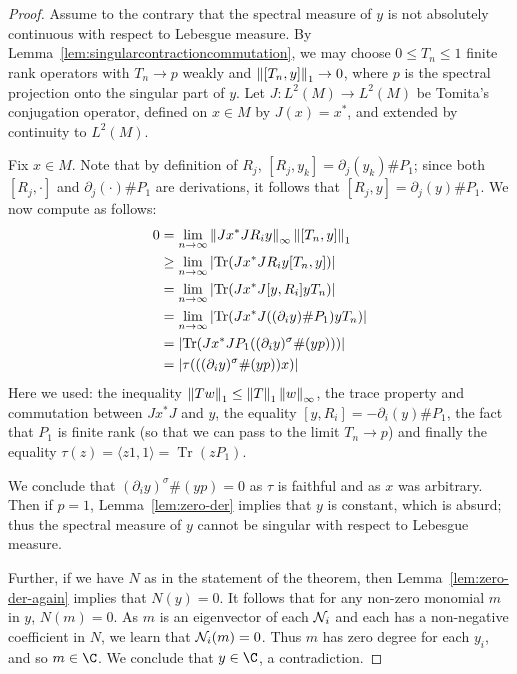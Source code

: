 \begin{proof}
	Assume to the contrary that the spectral measure of $y$ is not absolutely continuous with respect to Lebesgue measure.
	By Lemma~\ref{lem:singularcontractioncommutation}, we may choose $0\leq T_n \leq 1$ finite rank operators with $T_n\to p$ weakly and $\left\|[T_n,y]\right\|_1 \to 0$, where $p$ is the spectral projection onto the singular part of $y$.
	Let $J : L^2(M)\to L^2(M)$ be Tomita's conjugation operator, defined on $x \in M$ by $J(x) = x^*$, and extended by continuity to $L^2(M)$.

	Fix $x \in M$.
	Note that by definition of $R_j$, $[R_j,y_k]=\partial_j (y_k) \# P_1$; since both $[R_j,\cdot]$ and $\partial_j(\cdot)\#P_1$ are derivations, it follows that $[R_j,y]=\partial_j(y)\#P_1$.
	We now compute as follows:
	\begin{align*}
		0
		&= \lim_{n\to\infty} \left\| Jx^*J R_i y \right\|_\infty \left\| [T_n, y] \right\|_1 \\
		&\geq \lim_{n\to\infty} \left| \operatorname{Tr}( Jx^*J R_i y [T_n, y]) \right| \\
		&= \lim_{n\to\infty} \left| \operatorname{Tr}(Jx^*J [y, R_i] yT_n) \right| \\
		&= \lim_{n\to\infty} \left| \operatorname{Tr}(Jx^*J ((\partial_i y)\# P_1) yT_n) \right| \\
		&= \left| \operatorname{Tr}( Jx^*J P_1 ((\partial_i y)^\sigma \# (yp)) ) \right| \\
		&= \left| \tau(((\partial_i y)^\sigma\#(yp))x) \right|
	\end{align*}
	Here we used: the inequality $\left\| Tw \right\|_1 \leq \left\| T\right\|_1 \left\| w\right\|_\infty$, the trace property and commutation between $Jx^*J$ and $y$, the equality $[y,R_i] =-\partial_i(y)\#P_1$, the fact that $P_1$ is finite rank (so that we can pass to the limit $T_n\to p$) and finally the equality $\tau(z) = \langle z1, 1\rangle =\operatorname{Tr} (zP_1)$.

	We conclude that $(\partial_i y)^\sigma\#(yp) = 0$ as $\tau$ is faithful and as $x$ was arbitrary.
	Then if $p = 1$, Lemma~\ref{lem:zero-der} implies that $y$ is constant, which is absurd; thus the spectral measure of $y$ cannot be singular with respect to Lebesgue measure.

	Further, if we have $N$ as in the statement of the theorem, then Lemma~\ref{lem:zero-der-again} implies that $N(y) = 0$.
	It follows that for any non-zero monomial $m$ in $y$, $N(m) = 0$.
	As $m$ is an eigenvector of each $\mathcal{N}_i$ and each has a non-negative coefficient in $N$, we learn that $\mathcal{N}_i(m) = 0$.
	Thus $m$ has zero degree for each $y_i$, and so $m \in \C$.
	We conclude that $y \in \C$, a contradiction.
\end{proof}




